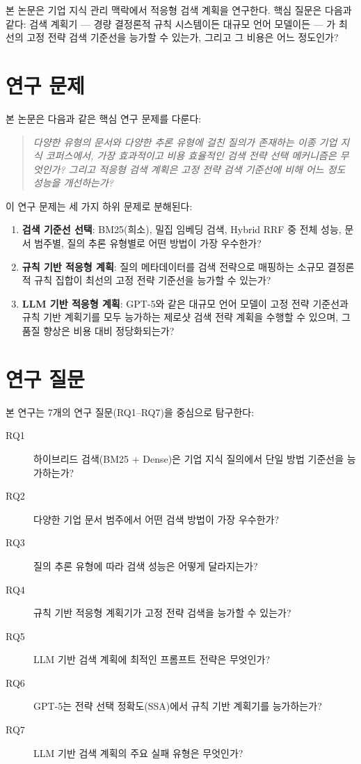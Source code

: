 본 논문은 기업 지식 관리 맥락에서 적응형 검색 계획을 연구한다. 핵심 질문은 다음과 같다: 검색 계획기 — 경량 결정론적 규칙 시스템이든 대규모 언어 모델이든 — 가 최선의 고정 전략 검색 기준선을 능가할 수 있는가, 그리고 그 비용은 어느 정도인가?

\section{연구 문제}
\label{sec:intro_problem_ko}

본 논문은 다음과 같은 핵심 연구 문제를 다룬다:

\begin{quote}
\emph{다양한 유형의 문서와 다양한 추론 유형에 걸친 질의가 존재하는 이종 기업 지식 코퍼스에서, 가장 효과적이고 비용 효율적인 검색 전략 선택 메커니즘은 무엇인가? 그리고 적응형 검색 계획은 고정 전략 검색 기준선에 비해 어느 정도 성능을 개선하는가?}
\end{quote}

이 연구 문제는 세 가지 하위 문제로 분해된다:

\begin{enumerate}
    \item \textbf{검색 기준선 선택}: BM25(희소), 밀집 임베딩 검색, Hybrid RRF 중 전체 성능, 문서 범주별, 질의 추론 유형별로 어떤 방법이 가장 우수한가?
    \item \textbf{규칙 기반 적응형 계획}: 질의 메타데이터를 검색 전략으로 매핑하는 소규모 결정론적 규칙 집합이 최선의 고정 전략 기준선을 능가할 수 있는가?
    \item \textbf{LLM 기반 적응형 계획}: GPT-5와 같은 대규모 언어 모델이 고정 전략 기준선과 규칙 기반 계획기를 모두 능가하는 제로샷 검색 전략 계획을 수행할 수 있으며, 그 품질 향상은 비용 대비 정당화되는가?
\end{enumerate}

\section{연구 질문}
\label{sec:intro_rqs_ko}

본 연구는 7개의 연구 질문(RQ1--RQ7)을 중심으로 탐구한다:

\begin{description}
    \item[RQ1] 하이브리드 검색(BM25 + Dense)은 기업 지식 질의에서 단일 방법 기준선을 능가하는가?
    \item[RQ2] 다양한 기업 문서 범주에서 어떤 검색 방법이 가장 우수한가?
    \item[RQ3] 질의 추론 유형에 따라 검색 성능은 어떻게 달라지는가?
    \item[RQ4] 규칙 기반 적응형 계획기가 고정 전략 검색을 능가할 수 있는가?
    \item[RQ5] LLM 기반 검색 계획에 최적인 프롬프트 전략은 무엇인가?
    \item[RQ6] GPT-5는 전략 선택 정확도(SSA)에서 규칙 기반 계획기를 능가하는가?
    \item[RQ7] LLM 기반 검색 계획의 주요 실패 유형은 무엇인가?
\end{description}

